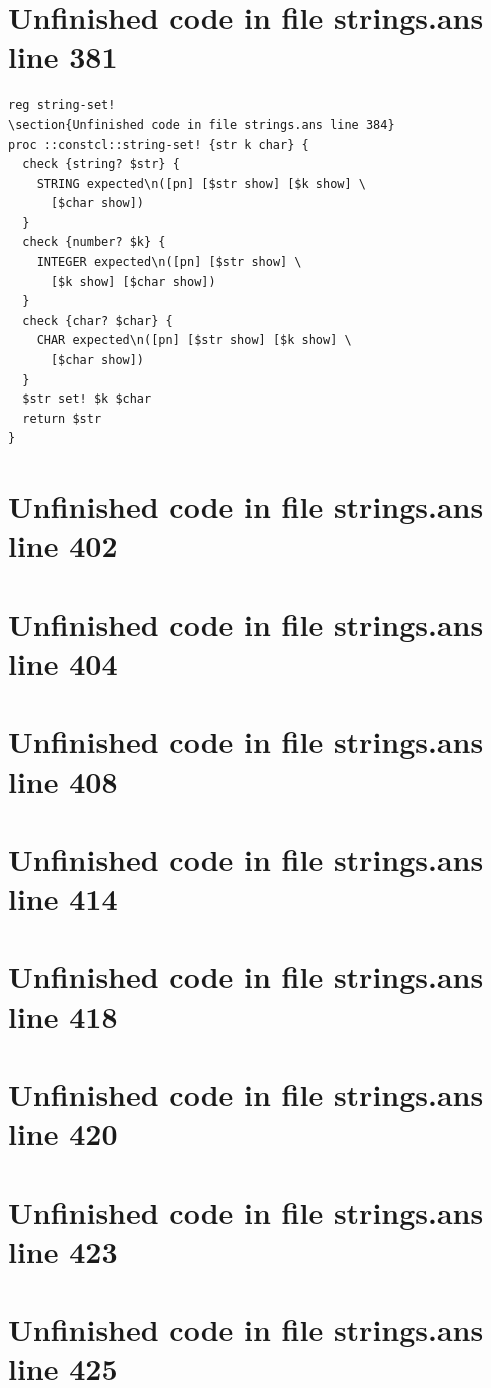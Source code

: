 \documentclass[twoside,9pt]{report}
\begin{document}
\section{Unfinished code in file strings.ans line 381}
\begin{lstlisting}
reg string-set!
\section{Unfinished code in file strings.ans line 384}
proc ::constcl::string-set! {str k char} {
  check {string? $str} {
    STRING expected\n([pn] [$str show] [$k show] \
      [$char show])
  }
  check {number? $k} {
    INTEGER expected\n([pn] [$str show] \
      [$k show] [$char show])
  }
  check {char? $char} {
    CHAR expected\n([pn] [$str show] [$k show] \
      [$char show])
  }
  $str set! $k $char
  return $str
}
\end{lstlisting}
\section{Unfinished code in file strings.ans line 402}
\section{Unfinished code in file strings.ans line 404}
\section{Unfinished code in file strings.ans line 408}
\section{Unfinished code in file strings.ans line 414}
\section{Unfinished code in file strings.ans line 418}
\section{Unfinished code in file strings.ans line 420}

\section{Unfinished code in file strings.ans line 423}
\section{Unfinished code in file strings.ans line 425}
\end{document}
